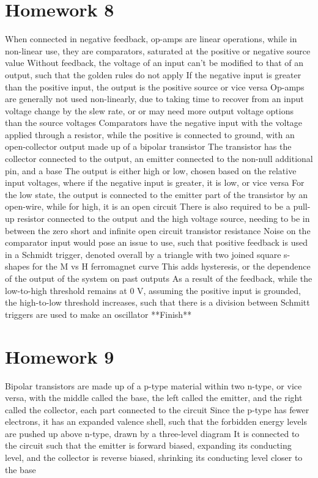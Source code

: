 \documentclass[11 pt, twoside]{article}
\newenvironment{outline*}
{
	\begin{outline}[enumerate]
	}
	{\end{outline}
}
\begin{document}
\section{Homework 8}
\begin{outline*}
\1 When connected in negative feedback, op-amps are linear operations, while in non-linear use, they are comparators, saturated at the positive or negative source value
	\2 Without feedback, the voltage of an input can't be modified to that of an output, such that the golden rules do not apply
		\3 If the negative input is greater than the positive input, the output is the positive source or vice versa
	\2 Op-amps are generally not used non-linearly, due to taking time to recover from an input voltage change by the slew rate, or or may need more output voltage options than the source voltages
\1 Comparators have the negative input with the voltage applied through a resistor, while the positive is connected to ground, with an open-collector output made up of a bipolar transistor
	\2 The transistor has the collector connected to the output, an emitter connected to the non-null additional pin, and a base
	\2 The output is either high or low, chosen based on the relative input voltages, where if the negative input is greater, it is low, or vice versa
		\3 For the low state, the output is connected to the emitter part of the transistor by an open-wire, while for high, it is an open circuit
	\2 There is also required to be a pull-up resistor connected to the output and the high voltage source, needing to be in between the zero short and infinite open circuit transistor resistance
\1 Noise on the comparator input would pose an issue to use, such that positive feedback is used in a Schmidt trigger, denoted overall by a triangle with two joined square s-shapes for the M vs H ferromagnet curve
	\2 This adds hysteresis, or the dependence of the output of the system on past outputs
	\2 As a result of the feedback, while the low-to-high threshold remains at 0 V, assuming the positive input is grounded, the high-to-low threshold increases, such that there is a division between
\1 Schmitt triggers are used to make an oscillator **Finish**
\end{outline*}
\section{Homework 9}
\begin{outline*}
\1 Bipolar transistors are made up of a p-type material within two n-type, or vice versa, with the middle called the base, the left called the emitter, and the right called the collector, each part connected to the circuit
	\2 Since the p-type has fewer electrons, it has an expanded valence shell, such that the forbidden energy levels are pushed up above n-type, drawn by a three-level diagram
		\3 It is connected to the circuit such that the emitter is forward biased, expanding its conducting level, and the collector is reverse biased, shrinking its conducting level closer to the base
\end{outline*}
\end{document}
